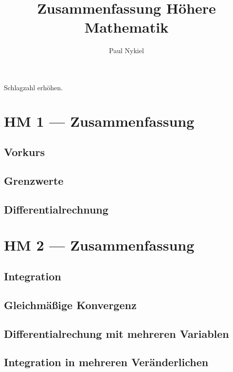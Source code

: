 \documentclass[10pt]{report}
\title{Zusammenfassung Höhere Mathematik}
\author{Paul Nykiel}
\begin{document}
    \maketitle
    \pagebreak
    Schlagzahl erhöhen.
    \pagebreak
    \tableofcontents
    \pagebreak

    \part{HM 1 --- Zusammenfassung}
    \chapter{Vorkurs}
    

    \chapter{Grenzwerte}
    

    \chapter{Differentialrechnung}
    

    \part{HM 2 --- Zusammenfassung}
    \chapter{Integration}
    

    \chapter{Gleichmäßige Konvergenz}
    

    \chapter{Differentialrechung mit mehreren Variablen}
    

    \chapter{Integration in mehreren Veränderlichen}
    
\end{document}
